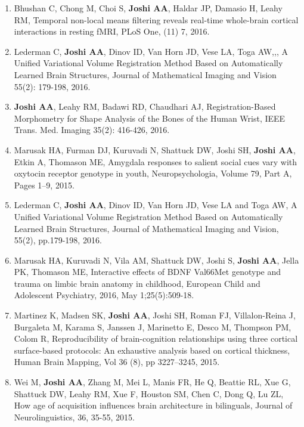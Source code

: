 \documentclass[overlapped,line,letterpaper]{res}
\begin{document}
\begin{resume}
\begin{enumerate}
    \item Bhushan C, Chong M, Choi S, \textbf{Joshi AA}, Haldar JP, Damasio H, Leahy RM, {Temporal non-local means filtering reveals real-time whole-brain cortical interactions in resting fMRI}, PLoS One, (11) 7, 2016.

    \item Lederman C, \textbf{Joshi AA}, Dinov ID, Van Horn JD, Vese LA, Toga AW,,, {A Unified Variational Volume Registration Method Based on Automatically Learned Brain Structures}, Journal of Mathematical Imaging and Vision 55(2): 179-198, 2016.

    \item \textbf{Joshi AA}, Leahy RM, Badawi RD, Chaudhari AJ, {Registration-Based Morphometry for Shape Analysis of the Bones of the Human Wrist}, IEEE Trans. Med. Imaging 35(2): 416-426, 2016.

    \item Marusak HA, Furman DJ, Kuruvadi N, Shattuck DW, Joshi SH, \textbf{Joshi AA}, Etkin A, Thomason ME, {Amygdala responses to salient social cues vary with oxytocin receptor genotype in youth}, Neuropsychologia, Volume 79, Part A, Pages 1–9, 2015.

    \item Lederman C, \textbf{Joshi AA}, Dinov ID, Van Horn JD, Vese LA and Toga AW, {A Unified Variational Volume Registration Method Based on Automatically Learned Brain Structures}, Journal of Mathematical Imaging and Vision, 55(2), pp.179-198, 2016.

    \item Marusak HA, Kuruvadi N, Vila AM, Shattuck DW, Joshi S, \textbf{Joshi AA}, Jella PK, Thomason ME, {Interactive effects of BDNF Val66Met genotype and trauma on limbic brain anatomy in childhood}, European Child and Adolescent Psychiatry, 2016, May 1;25(5):509-18.

    \item Martinez K, Madsen SK, \textbf{Joshi AA}, Joshi SH, Roman FJ, Villalon-Reina J, Burgaleta M, Karama S, Janssen J, Marinetto E, Desco M, Thompson PM, Colom R, {Reproducibility of brain-cognition relationships using three cortical surface-based protocols: An exhaustive analysis based on cortical thickness}, Human Brain Mapping, Vol 36 (8), pp 3227–3245, 2015.

    \item Wei M, \textbf{Joshi AA}, Zhang M, Mei L, Manis FR, He Q, Beattie RL, Xue G, Shattuck DW, Leahy RM, Xue F, Houston SM, Chen C, Dong Q, Lu ZL, {How age of acquisition influences brain architecture in bilinguals}, Journal of Neurolinguistics, 36, 35-55, 2015. 


\end{enumerate}
\end{resume}
\end{document}
